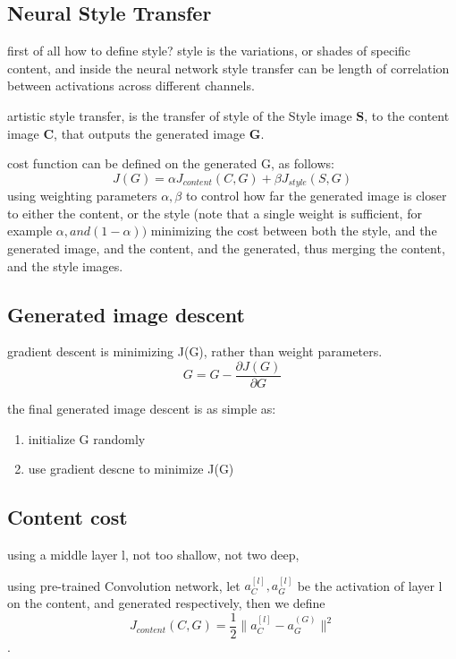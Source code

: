 \documentclass[4apaper,12pt]{book}
\begin{document}
\begin{description}
    \section{Neural Style Transfer}
    \begin{description}
      \item first of all how to define style? style is the variations, or shades of specific content, and inside the neural network style transfer can be length of correlation between activations across different channels.
      \item artistic style transfer, is the transfer of style of the Style image \textbf{S}, to the content image \textbf{C}, that outputs the generated image \textbf{G}.
      \item cost function can be defined on the generated G, as follows: $$J(G) = \alpha J_{content}(C,G) + \beta J_{style}(S,G) $$ using weighting parameters $\alpha, \beta $ to control how far the generated image is closer to either the content, or the style (note that a single weight is sufficient, for example $\alpha, and (1-\alpha))$ minimizing the cost between both the style, and the generated image, and the content, and the generated, thus merging the content, and the style images.
        \subsection{Generated image descent}
        \begin{description}
      \item gradient descent is minimizing J(G), rather than weight parameters. $$ G=G-\frac{\partial{J(G)}}{\partial{G}} $$
      \item the final generated image descent is as simple as: \begin{enumerate}
      \item initialize G randomly
      \item use gradient descne to minimize J(G)
      \end{enumerate}
        \end{description}
        \subsection{Content cost}
        \begin{description}
        \item using a middle layer l, not too shallow, not two deep,
        \item using pre-trained Convolution network, let $a_C^{[l]}, a_G^{[l]}$ be the activation of layer l on the content, and generated respectively, then we define $$J_{content}(C, G) = \frac{1}{2}\|a_C^{[l]} - a_G^{(G)}\|^2$$.
        \end{description}

\end{description}
\end{description}
\end{document}
